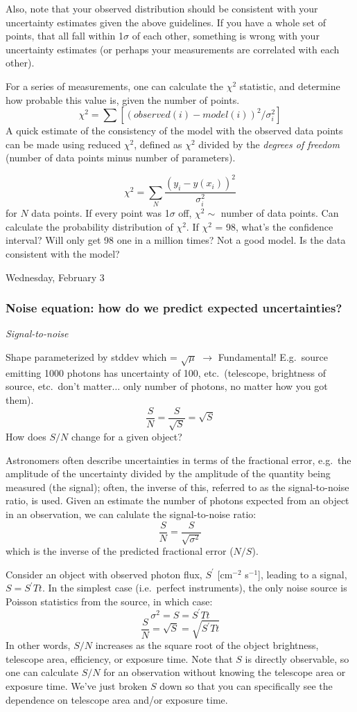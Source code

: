\documentclass[12pt]{article}
\begin{document}
Also, note that your observed distribution should be
consistent with your uncertainty estimates given the above guidelines.
If you have a whole set of points, that all fall within 1$\sigma$ of
each other, something is wrong with your uncertainty estimates (or
perhaps your measurements are correlated with each other).

For a series of measurements, one can calculate the
$\chi^{2}$ statistic, and determine how probable this value is,
given the number of points.
    $$ \chi^2 = \sum [(observed(i)-model(i))^2/\sigma_i^2]  $$
A quick estimate of the consistency of the model with the observed
data points can be made using reduced $\chi^{2}$, defined as
$\chi^{2}$ divided by the \emph{degrees of freedom} (number of data points
minus number of parameters).

\textcolor{myBlue}{%
    $$  \chi^2 = \sum_N \frac{(y_i-y(x_i))^2}{\sigma_i^2} $$
for $N$ data points. If every point was 1$\sigma$ off,
$\chi^2 \sim$ number of data points. Can calculate the probability
distribution of $\chi^2$. If $\chi^2$ = 98, what's the confidence
interval? Will only get 98 one in a million times? Not a good model.
Is the data consistent with the model?
}

\textcolor{date}{Wednesday, February 3}
\subsubsection{Noise equation: how do we predict expected
uncertainties?}
\emph{Signal-to-noise}

\textcolor{myBlue}{%
Shape parameterized by stddev which = $\sqrt{\mu}$
$\rightarrow$ Fundamental! E.g.\ source emitting 1000 photons has
uncertainty of 100, etc.\ (telescope, brightness of source, etc.\ don't
matter$\ldots$ only number of photons, no matter how you got them).
    $$ \frac{S}{N} = \frac{S}{\sqrt{S}} = \sqrt{S} $$
How does $S/N$ change for a given object?
}

Astronomers often describe uncertainties in terms of the fractional
error, e.g.\ the amplitude of the uncertainty divided by the amplitude
of the quantity being measured (the signal);
often, the inverse of this, referred
to as the signal-to-noise ratio, is used. Given an estimate the number
of photons expected from an object in an observation, we can calulate
the signal-to-noise ratio:
    $$ \frac{S}{N} = \frac{S}{\sqrt{\sigma^2}} $$
which is the inverse of the predicted fractional error ($N/S$).

Consider an object with observed photon flux, $S^{\prime}$
[cm$^{-2}$ s$^{-1}$],
leading to a signal, $S = S^{\prime}Tt$.
In the simplest case (i.e.\ perfect
instruments), the only noise
source is Poisson statistics from the source, in which case:
    $$ \sigma^2 = S = S^{\prime}Tt $$
    $$ \frac{S}{N} = \sqrt{S} = \sqrt{S^{\prime}Tt} $$
In other words, $S/N$ increases as the square root of the object
brightness, telescope area, efficiency, or exposure time. Note that $S$
is directly observable, so one can calculate $S/N$ for an
observation without knowing the telescope area or exposure time.
We've just broken $S$ down so that you can specifically see the dependence on
telescope area and/or exposure time.
\end{document}
